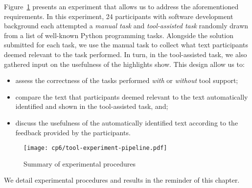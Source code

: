 Figure~\ref{fig:tool-experiment-procedures} presents an experiment that allows us to address the aforementioned requirements. In this experiment, 24 participants with software development background each attempted a
\textit{manual task} and \textit{tool-assisted task} randomly drawn from a list of well-known Python programming tasks.
Alongside the solution submitted for each task, we use the manual task to collect what text participants deemed relevant to the task performed.
In turn, in the tool-assisted task, we also gathered input on the usefulness of the highlights show. 
This design allow us to:




\begin{itemize}
    \item assess the correctness of the tasks performed \textit{with} or \textit{without} tool support;
    \item compare  the text that participants deemed relevant to the text automatically identified
    and shown in the tool-assisted task, and;
    \item discuss the usefulness of the automatically identified text according to the feedback provided by the participants.
\end{itemize}
 





\begin{figure}
\centering
\texttt{[image: cp6/tool-experiment-pipeline.pdf]}
\caption{Summary of experimental procedures}
\label{fig:tool-experiment-procedures}
\end{figure}





We detail experimental procedures and results in the reminder of this chapter.





 

 

